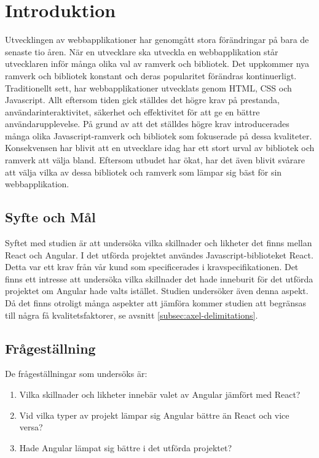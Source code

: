 \section{Introduktion}
\label{sec:axel-introduction}
Utvecklingen av webbapplikationer har genomgått stora förändringar på bara de senaste tio åren. \cite{changing} När en utvecklare ska utveckla en webbapplikation står utvecklaren inför många olika val av ramverk och bibliotek. Det uppkommer nya ramverk och bibliotek konstant och deras popularitet förändras kontinuerligt. Traditionellt sett, har webbapplikationer utvecklats genom HTML, CSS och Javascript. Allt eftersom tiden gick ställdes det högre krav på prestanda, användarinteraktivitet, säkerhet och effektivitet för att ge en bättre användarupplevelse. På grund av att det ställdes högre krav introducerades många olika Javascript-ramverk och bibliotek som fokuserade på dessa kvaliteter. Konsekvensen har blivit att en utvecklare idag har ett stort urval av bibliotek och ramverk att välja bland. Eftersom utbudet har ökat, har det även blivit svårare att välja vilka av dessa bibliotek och ramverk som lämpar sig bäst för sin webbapplikation.

\subsection{Syfte och Mål}
\label{subsec:motivation}

Syftet med studien är att undersöka vilka skillnader och likheter det finns mellan React och Angular. I det utförda projektet användes Javascript-biblioteket React. Detta var ett krav från vår kund som specificerades i kravspecifikationen. Det finns ett intresse att undersöka vilka skillnader det hade inneburit för det utförda projektet om Angular hade valts istället. Studien undersöker även denna aspekt. Då det finns otroligt många aspekter att jämföra kommer studien att begränsas till några få kvalitetsfaktorer, se avsnitt      \ref{subsec:axel-delimitations}.

\subsection{Frågeställning}
\label{subsec:research-questions}

De frågeställningar som undersöks är:

\begin{enumerate}
\item\label{axel-fs:1} Vilka skillnader och likheter innebär valet av Angular jämfört med React?

\item\label{axel-fs:2} Vid vilka typer av projekt lämpar sig Angular bättre än React och vice versa?

\item\label{axel-fs:3} Hade Angular lämpat sig bättre i det utförda projektet?


\end{enumerate}


